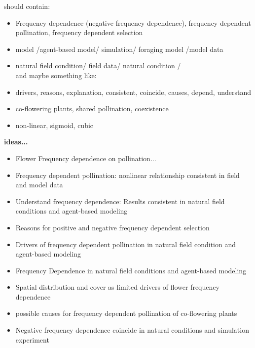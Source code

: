 \documentclass{article}
\begin{document}
should contain:
\begin{itemize}
\item Frequency dependence (negative frequency dependence), frequency dependent pollination, frequency dependent selection
\item model /agent-based model/ simulation/ foraging model /model data
\item natural field condition/ field data/ natural condition / \\

and maybe something like:
\item drivers, reasons, explanation, consistent, coincide, causes, depend, understand
\item co-flowering plants, shared pollination, coexistence
\item non-linear, sigmoid, cubic
\end{itemize}

\textbf{ideas...}
\begin{itemize}
\item Flower Frequency dependence on pollination...

\item Frequency dependent pollination: nonlinear relationship consistent in field and model data

\item Understand frequency dependence: Results consistent in natural field conditions and agent-based modeling

\item  Reasons for positive and negative frequency dependent selection

\item Drivers of frequency dependent pollination in natural field condition and agent-based modeling

\item Frequency Dependence in natural field conditions and agent-based modeling

\item Spatial distribution and cover as limited drivers of flower frequency dependence

\item  possible causes for frequency dependent pollination of co-flowering plants 

\item  Negative frequency dependence coincide in natural conditions and simulation experiment


\end{itemize}
\end{document}
